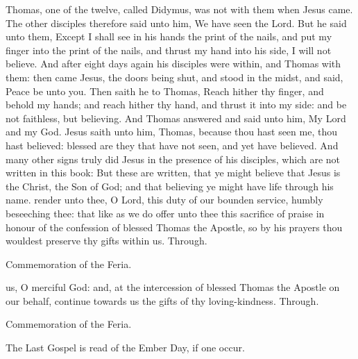  Thomas, one of the twelve, called Didymus, was not with them when Jesus came. The other disciples therefore said unto him, We have seen the Lord. But he said unto them, Except I shall see in his hands the print of the nails, and put my finger into the print of the nails, and thrust my hand into his side, I will not believe. And after eight days again his disciples were within, and Thomas with them: then came Jesus, the doors being shut, and stood in the midst, and said, Peace be unto you. Then saith he to Thomas, Reach hither thy finger, and behold my hands; and reach hither thy hand, and thrust it into my side: and be not faithless, but believing. And Thomas answered and said unto him, My Lord and my God. Jesus saith unto him, Thomas, because thou hast seen me, thou hast believed: blessed are they that have not seen, and yet have believed. And many other signs truly did Jesus in the presence of his disciples, which are not written in this book: But these are written, that ye might believe that Jesus is the Christ, the Son of God; and that believing ye might have life through his name.
\secret
{} render unto thee, O Lord, this duty of our bounden service, humbly beseeching thee: that like as we do offer unto thee this sacrifice of praise in honour of the confession of blessed Thomas the Apostle, so by his prayers thou wouldest preserve thy gifts within us. Through.
\begin{rubric}
    Commemoration of the Feria.%
\end{rubric}
\postcommunion
{} us, O merciful God: and, at the intercession of blessed Thomas the Apostle on our behalf, continue towards us the gifts of thy loving-kindness. Through.
\begin{rubric}
    Commemoration of the Feria.%
\end{rubric}
\begin{rubric}
    The Last Gospel is read of the Ember Day, if one occur.%
\end{rubric}


